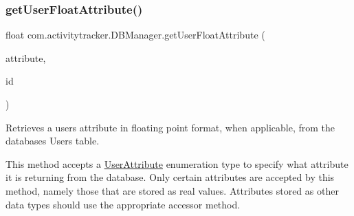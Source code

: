 \mbox{\label{classcom_1_1activitytracker_1_1_d_b_manager_a98df66254bec4d74b29cfe468a9fc794}} 
\subsubsection{\texorpdfstring{get\+User\+Float\+Attribute()}{getUserFloatAttribute()}}
{\footnotesize\ttfamily float com.\+activitytracker.\+D\+B\+Manager.\+get\+User\+Float\+Attribute (\begin{DoxyParamCaption}\item[{final \mbox{\hyperlink{enumcom_1_1activitytracker_1_1_user_attribute}{User\+Attribute}}}]{attribute,  }\item[{final int}]{id }\end{DoxyParamCaption})}

Retrieves a user\textquotesingle{}s attribute in floating point format, when applicable, from the database\textquotesingle{}s Users table.

This method accepts a \mbox{\hyperlink{enumcom_1_1activitytracker_1_1_user_attribute}{User\+Attribute}} enumeration type to specify what attribute it is returning from the database. Only certain attributes are accepted by this method, namely those that are stored as real values. Attributes stored as other data types should use the appropriate accessor method.


